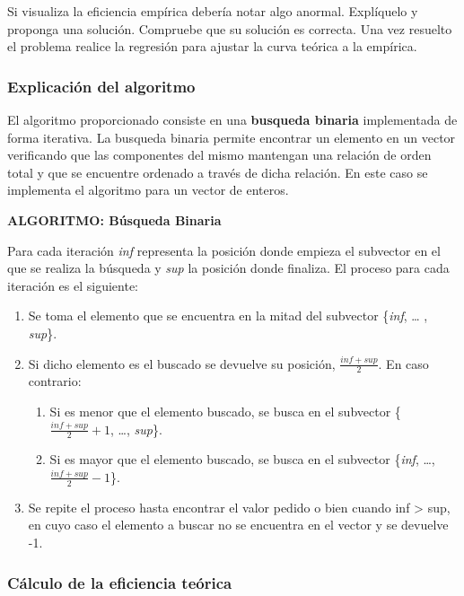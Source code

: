 \documentclass[]{article}
\begin{document}
Si visualiza la eficiencia empírica debería notar algo anormal.
Explíquelo y proponga una solución. Compruebe que su solución es
correcta. Una vez resuelto el problema realice la regresión para ajustar
la curva teórica a la empírica.

\subsubsection{Explicación del
algoritmo}\label{explicacion-del-algoritmo}

El algoritmo proporcionado consiste en una \textbf{busqueda binaria}
implementada de forma iterativa. La busqueda binaria permite encontrar
un elemento en un vector verificando que las componentes del mismo
mantengan una relación de orden total y que se encuentre ordenado a
través de dicha relación. En este caso se implementa el algoritmo para
un vector de enteros.

\textbf{ALGORITMO: Búsqueda Binaria}

Para cada iteración \emph{inf} representa la posición donde empieza el
subvector en el que se realiza la búsqueda y \emph{sup} la posición
donde finaliza. El proceso para cada iteración es el siguiente:

\begin{enumerate}
\def\labelenumi{\arabic{enumi}.}
\itemsep1pt\parskip0pt
\item
  Se toma el elemento que se encuentra en la mitad del subvector
  \{\emph{inf}, \ldots{} , \emph{sup}\}.
\item
  Si dicho elemento es el buscado se devuelve su posición,
  $\frac{inf+sup}{2}$. En caso contrario:

  \begin{enumerate}
  \def\labelenumii{\alph{enumii})}
  \itemsep1pt\parskip0pt
  \item
    Si es menor que el elemento buscado, se busca en el subvector
    \{$\frac{inf+sup}{2}+1$, \ldots{}, \emph{sup}\}.
  \item
    Si es mayor que el elemento buscado, se busca en el subvector
    \{\emph{inf}, \ldots{}, $\frac{inf+sup}{2}-1$\}.
  \end{enumerate}
\item
  Se repite el proceso hasta encontrar el valor pedido o bien cuando inf
  \textgreater{} sup, en cuyo caso el elemento a buscar no se encuentra
  en el vector y se devuelve -1.
\end{enumerate}

\subsubsection{Cálculo de la eficiencia
teórica}\label{calculo-de-la-eficiencia-teorica-1}
\end{document}
